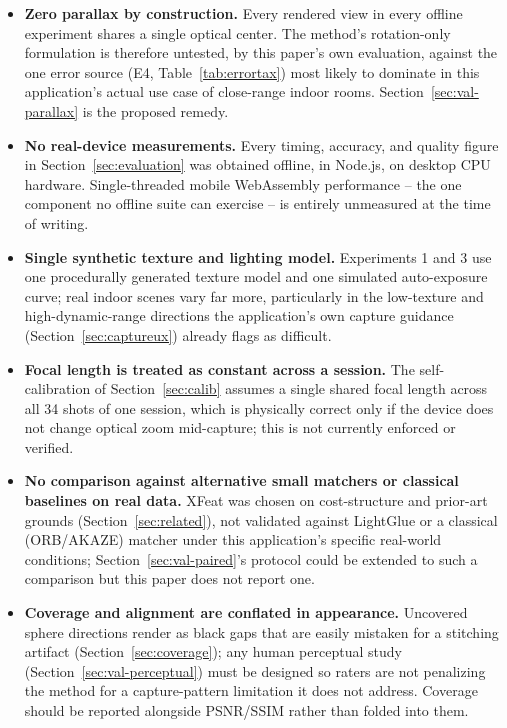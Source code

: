 \documentclass[11pt]{article}
\begin{document}
\begin{itemize}
\item \textbf{Zero parallax by construction.} Every rendered view in every offline experiment shares a single optical center. The method's rotation-only formulation is therefore untested, by this paper's own evaluation, against the one error source (E4, Table~\ref{tab:errortax}) most likely to dominate in this application's actual use case of close-range indoor rooms. Section~\ref{sec:val-parallax} is the proposed remedy.
\item \textbf{No real-device measurements.} Every timing, accuracy, and quality figure in Section~\ref{sec:evaluation} was obtained offline, in Node.js, on desktop CPU hardware. Single-threaded mobile WebAssembly performance -- the one component no offline suite can exercise -- is entirely unmeasured at the time of writing.
\item \textbf{Single synthetic texture and lighting model.} Experiments 1 and 3 use one procedurally generated texture model and one simulated auto-exposure curve; real indoor scenes vary far more, particularly in the low-texture and high-dynamic-range directions the application's own capture guidance (Section~\ref{sec:captureux}) already flags as difficult.
\item \textbf{Focal length is treated as constant across a session.} The self-calibration of Section~\ref{sec:calib} assumes a single shared focal length across all 34 shots of one session, which is physically correct only if the device does not change optical zoom mid-capture; this is not currently enforced or verified.
\item \textbf{No comparison against alternative small matchers or classical baselines on real data.} XFeat was chosen on cost-structure and prior-art grounds (Section~\ref{sec:related}), not validated against LightGlue or a classical (ORB/AKAZE) matcher under this application's specific real-world conditions; Section~\ref{sec:val-paired}'s protocol could be extended to such a comparison but this paper does not report one.
\item \textbf{Coverage and alignment are conflated in appearance.} Uncovered sphere directions render as black gaps that are easily mistaken for a stitching artifact (Section~\ref{sec:coverage}); any human perceptual study (Section~\ref{sec:val-perceptual}) must be designed so raters are not penalizing the method for a capture-pattern limitation it does not address. Coverage should be reported alongside PSNR/SSIM rather than folded into them.
\end{itemize}
\end{document}
